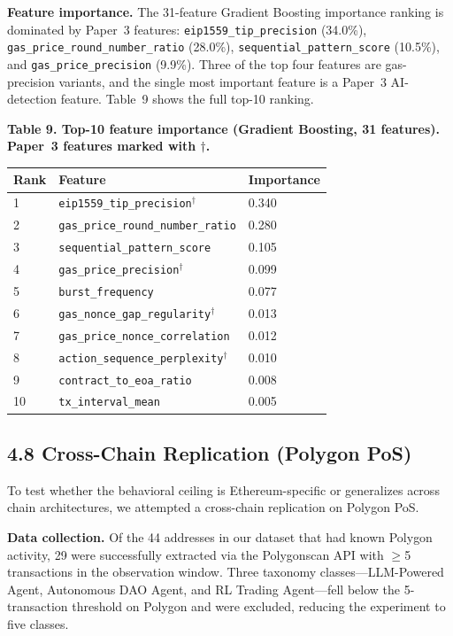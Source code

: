 \documentclass[sigconf,nonacm=false]{acmart}
\begin{document}
\textbf{Feature importance.} The 31-feature Gradient Boosting importance ranking is dominated by Paper~3 features: \texttt{eip1559\_tip\_precision} (34.0\%), \texttt{gas\_price\_round\_number\_ratio} (28.0\%), \texttt{sequential\_pattern\_score} (10.5\%), and \texttt{gas\_price\_precision} (9.9\%). Three of the top four features are gas-precision variants, and the single most important feature is a Paper~3 AI-detection feature. Table~9 shows the full top-10 ranking.

\textbf{Table 9. Top-10 feature importance (Gradient Boosting, 31 features). Paper~3 features marked with $\dagger$.}

\begin{table}[h]
\centering
\small
\begin{tabular}{lll}
\toprule
Rank & Feature & Importance \\
\midrule
1 & \texttt{eip1559\_tip\_precision}$^\dagger$ & 0.340 \\
2 & \texttt{gas\_price\_round\_number\_ratio} & 0.280 \\
3 & \texttt{sequential\_pattern\_score} & 0.105 \\
4 & \texttt{gas\_price\_precision}$^\dagger$ & 0.099 \\
5 & \texttt{burst\_frequency} & 0.077 \\
6 & \texttt{gas\_nonce\_gap\_regularity}$^\dagger$ & 0.013 \\
7 & \texttt{gas\_price\_nonce\_correlation} & 0.012 \\
8 & \texttt{action\_sequence\_perplexity}$^\dagger$ & 0.010 \\
9 & \texttt{contract\_to\_eoa\_ratio} & 0.008 \\
10 & \texttt{tx\_interval\_mean} & 0.005 \\
\bottomrule
\end{tabular}
\end{table}


\subsection{4.8 Cross-Chain Replication (Polygon PoS)}

To test whether the behavioral ceiling is Ethereum-specific or generalizes across chain architectures, we attempted a cross-chain replication on Polygon PoS.

\textbf{Data collection.} Of the 44 addresses in our dataset that had known Polygon activity, 29 were successfully extracted via the Polygonscan API with $\geq$5 transactions in the observation window. Three taxonomy classes---LLM-Powered Agent, Autonomous DAO Agent, and RL Trading Agent---fell below the 5-transaction threshold on Polygon and were excluded, reducing the experiment to five classes.
\end{document}

